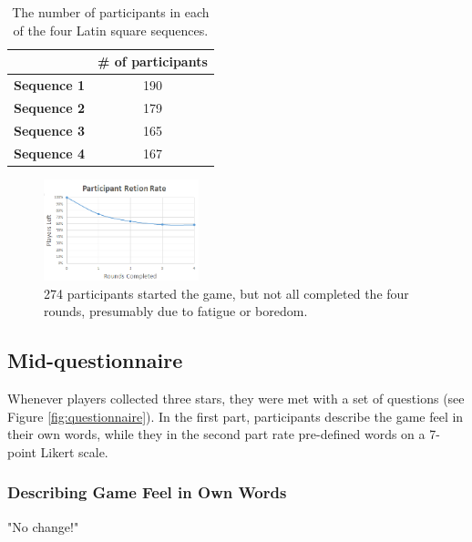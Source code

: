 \begin{table}[htbp]
\scriptsize
\centering
\begin{tabular}{|c|c|}
\hline
 & \textbf{\# of participants}\\
 \hline
\textbf{Sequence 1} & 190\\
\hline
\textbf{Sequence 2} & 179\\
\hline
\textbf{Sequence 3} & 165\\
\hline
\textbf{Sequence 4} & 167\\
\hline
\end{tabular}
\caption{The number of participants in each of the four Latin square sequences.}
\label{table:latinSequenceNumber}
\end{table}

\begin{figure}[htbp]
\centering
\includegraphics[width=0.4\textwidth]{Pics/retetionRate}
\caption{274 participants started the game, but not all completed the four rounds, presumably due to fatigue or boredom.}
\label{fig:retention}
\end{figure}

\subsection{Mid-questionnaire}
Whenever players collected three stars, they were met with a set of questions (see Figure \ref{fig:questionnaire}). In the first part, participants describe the game feel in their own words, while they in the second part rate pre-defined words on a 7-point Likert scale.

\subsubsection{Describing Game Feel in Own Words}
"No change!"

